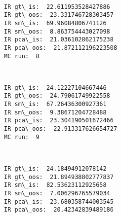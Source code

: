 \documentclass[11pt]{article}
\begin{document}
    \begin{center}
    \end{center}
    { \hspace*{\fill} \\}
    
    \begin{Verbatim}[commandchars=\\\{\},fontsize=\footnotesize]
IR gt\_is:  22.611953528427886
IR gt\_oos:  23.331746728303457
IR sm\_is:  69.96084806741126
IR sm\_oos:  8.863754443027098
IR pca\_is:  21.036102862175238
IR pca\_oos:  21.872112196223508
MC run:  8

    \end{Verbatim}

    \begin{center}
    \end{center}
    { \hspace*{\fill} \\}
    
    \begin{Verbatim}[commandchars=\\\{\},fontsize=\footnotesize]
IR gt\_is:  24.12227104667446
IR gt\_oos:  24.79061749922558
IR sm\_is:  67.26436300927361
IR sm\_oos:  9.38671204728488
IR pca\_is:  23.304190501672466
IR pca\_oos:  22.913317626654727
MC run:  9

    \end{Verbatim}

    \begin{center}
    \end{center}
    { \hspace*{\fill} \\}
    
    \begin{Verbatim}[commandchars=\\\{\},fontsize=\footnotesize]
IR gt\_is:  24.18494912078142
IR gt\_oos:  21.894938802777837
IR sm\_is:  82.53623112925658
IR sm\_oos:  7.006296765579034
IR pca\_is:  23.680358744003545
IR pca\_oos:  20.42342839489186

    \end{Verbatim}
\end{document}
